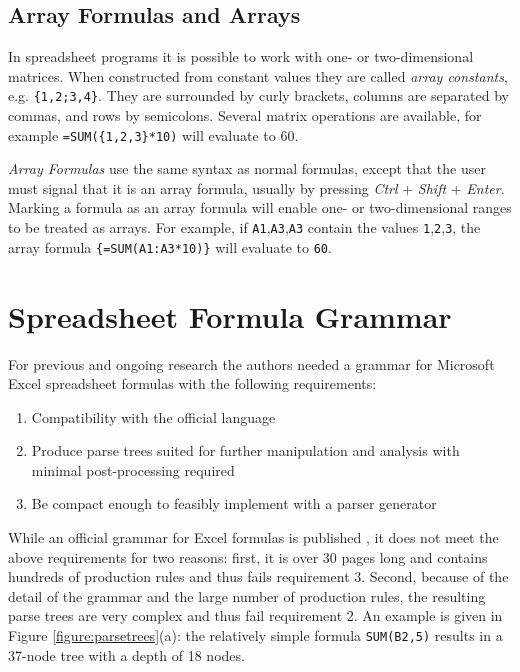 \documentclass[times]{smrauth}
\begin{document}
\subsection{Array Formulas and Arrays}
\label{sec:arrayformulas}
In spreadsheet programs it is possible to work with one- or two-dimensional matrices. When constructed from constant values they are called \emph{array constants}, e.g. \texttt{\{1,2;3,4\}}.
They are surrounded by curly brackets, columns are separated by commas, and rows by semicolons.
Several matrix operations are available, for example \texttt{=SUM(\{1,2,3\}*10)} will evaluate to 60.

\emph{Array Formulas} use the same syntax as normal formulas, except that the user must signal that it is an array formula, usually by pressing \emph{Ctrl} + \emph{Shift} + \emph{Enter}.
Marking a formula as an array formula will enable one- or two-dimensional ranges to be treated as arrays.
For example, if \texttt{A1},\texttt{A3},\texttt{A3} contain the values \texttt{1},\texttt{2},\texttt{3}, the array formula \texttt{\{=SUM(A1:A3*10)\}} will evaluate to \texttt{60}.

\section{Spreadsheet Formula Grammar}
\label{section:grammar}

For previous and ongoing research the authors needed a grammar for Microsoft Excel spreadsheet formulas with the following requirements:

\label{sec:designgoals}
\begin{enumerate}
	\item Compatibility with the official language
	\item Produce parse trees suited for further manipulation and analysis with minimal post-processing required
	\item Be compact enough to feasibly implement with a parser generator
\end{enumerate}

While an official grammar for Excel formulas is published \cite{ExcelOfficialGrammar}, it does not meet the above requirements for two reasons: first, it is over 30 pages long and contains hundreds of production rules and thus fails requirement 3.
Second, because of the detail of the grammar and the large number of production rules, the resulting parse trees are very complex and thus fail requirement 2.
An example is given in Figure \ref{figure:parsetrees}(a): the relatively simple formula \texttt{SUM(B2,5)} results in a 37-node tree with a depth of 18 nodes.
\end{document}
